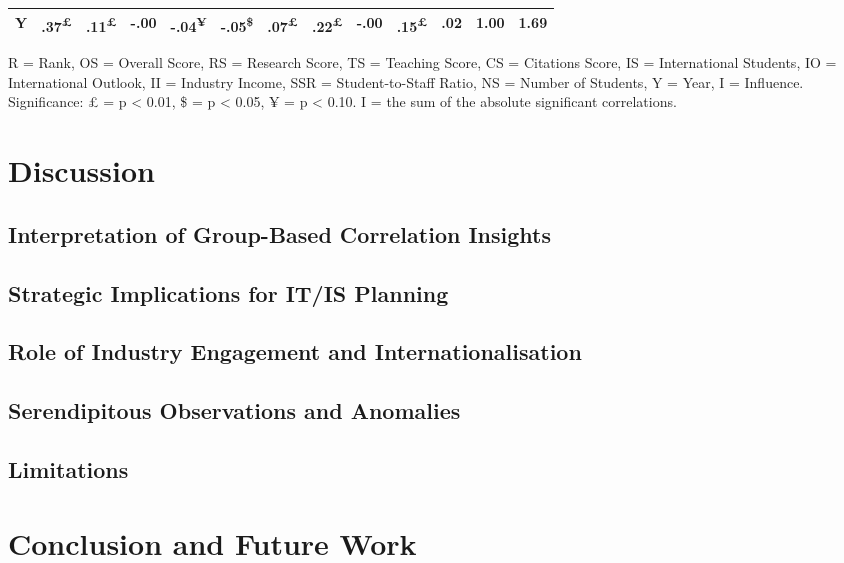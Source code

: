 \documentclass{singlecol-new}
\theoremstyle{TH}{
\newtheorem{lemma}{Lemma}
\newtheorem{theorem}[lemma]{Theorem}
\newtheorem{corrolary}[lemma]{Corrolary}
\newtheorem{conjecture}[lemma]{Conjecture}
\newtheorem{proposition}[lemma]{Proposition}
\newtheorem{claim}[lemma]{Claim}
\newtheorem{stheorem}[lemma]{Wrong Theorem}
\newtheorem{algorithm}{Algorithm}
}
\theoremstyle{THrm}{
\newtheorem{definition}{Definition}[section]
\newtheorem{question}{Question}[section]
\newtheorem{remark}{Remark}
\newtheorem{scheme}{Scheme}
}
\theoremstyle{THhit}{
\newtheorem{case}{Case}[section]
}
\begin{document}
\begin{table*}[h!]
\begin{tabular}{lrrrrrrrrrrrr}
		Y  & \cellcolor{gray!18}.37\textsuperscript{£} & \cellcolor{gray!5}.11\textsuperscript{£} & \cellcolor{gray!0}-.00 & \cellcolor{gray!2}-.04\textsuperscript{¥} & \cellcolor{gray!2}-.05\textsuperscript{\$} & \cellcolor{gray!3}.07\textsuperscript{£} & \cellcolor{gray!11}.22\textsuperscript{£} & \cellcolor{gray!0}-.00 & \cellcolor{gray!7}.15\textsuperscript{£} & \cellcolor{gray!1}.02 & \cellcolor{gray!50}1.00 & 1.69 \\ \hline
	\end{tabular}
	
	
	\vspace{1mm}
	
\scriptsize
R = Rank, OS = Overall Score, RS = Research Score, TS = Teaching Score, CS = Citations Score, IS = International Students, IO = International Outlook, II = Industry Income, SSR = Student-to-Staff Ratio, NS = Number of Students, Y = Year, I = Influence. Significance: £ = p < 0.01, \$ = p < 0.05, ¥ = p < 0.10. I = the sum of the absolute significant correlations.


\end{table*}


\section{Discussion}
\subsection{Interpretation of Group-Based Correlation Insights}
\subsection{Strategic Implications for IT/IS Planning}
\subsection{Role of Industry Engagement and Internationalisation}
\subsection{Serendipitous Observations and Anomalies}
\subsection{Limitations}

\section{Conclusion and Future Work}
\end{document}
